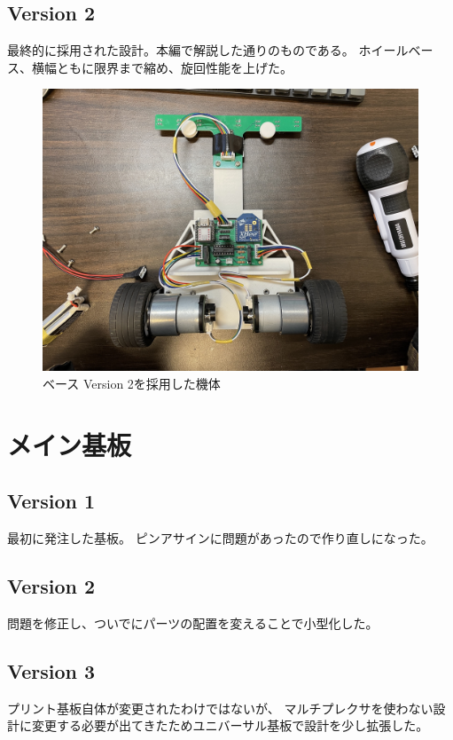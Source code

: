 \documentclass{ltjsreport}
\begin{document}
\subsection{Version 2}
最終的に採用された設計。本編で解説した通りのものである。
ホイールベース、横幅ともに限界まで縮め、旋回性能を上げた。
\begin{figure}[bth]
  \centering
  \includegraphics[keepaspectratio, scale=0.11]
       {img/ver1_machine.jpg}
  \caption{ベース Version 2を採用した機体}
  \label{fig:v2_machine}
 \end{figure}


\section{メイン基板}
\subsection{Version 1}
最初に発注した基板。
ピンアサインに問題があったので作り直しになった。

\subsection{Version 2}
問題を修正し、ついでにパーツの配置を変えることで小型化した。


\subsection{Version 3}
プリント基板自体が変更されたわけではないが、
マルチプレクサを使わない設計に変更する必要が出てきたためユニバーサル基板で設計を少し拡張した。
\end{document}
